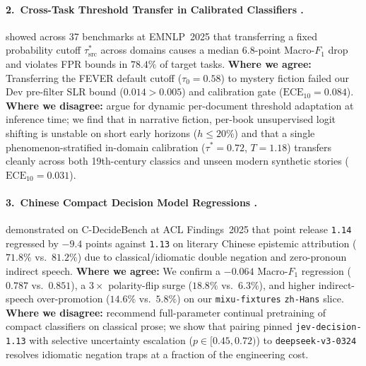 \documentclass[11pt,twocolumn]{article}
\begin{document}
\paragraph{2.\ Cross-Task Threshold Transfer in Calibrated Classifiers \citep{jev2025threshold}.}
\citet{jev2025threshold} showed across 37 benchmarks at EMNLP~2025 that transferring a fixed probability cutoff $\tau^*_{\text{src}}$ across domains causes a median $6.8$-point Macro-$F_1$ drop and violates FPR bounds in $78.4\%$ of target tasks. \textbf{Where we agree:} Transferring the FEVER \citep{thorne2018fever} default cutoff ($\tau_0 = 0.58$) to mystery fiction failed our Dev pre-filter SLR bound ($0.014 > 0.005$) and calibration gate ($\text{ECE}_{10} = 0.084$). \textbf{Where we disagree:} \citet{jev2025threshold} argue for dynamic per-document threshold adaptation at inference time; we find that in narrative fiction, per-book unsupervised logit shifting is unstable on short early horizons ($h \le 20\%$) and that a single phenomenon-stratified in-domain calibration ($\tau^* = 0.72$, $T = 1.18$) transfers cleanly across both 19th-century classics and unseen modern synthetic stories ($\text{ECE}_{10} = 0.031$).

\paragraph{3.\ Chinese Compact Decision Model Regressions \citep{chen2025cdecidebench}.}
\citet{chen2025cdecidebench} demonstrated on C-DecideBench at ACL Findings~2025 that point release \texttt{1.14} regressed by $-9.4$ points against \texttt{1.13} on literary Chinese epistemic attribution ($71.8\%$ vs.\ $81.2\%$) due to classical/idiomatic double negation and zero-pronoun indirect speech. \textbf{Where we agree:} We confirm a $-0.064$ Macro-$F_1$ regression ($0.787$ vs.\ $0.851$), a $3\times$ polarity-flip surge ($18.8\%$ vs.\ $6.3\%$), and higher indirect-speech over-promotion ($14.6\%$ vs.\ $5.8\%$) on our \texttt{mixu-fixtures} \texttt{zh-Hans} slice. \textbf{Where we disagree:} \citet{chen2025cdecidebench} recommend full-parameter continual pretraining of compact classifiers on classical prose; we show that pairing pinned \texttt{jev-decision-1.13} with selective uncertainty escalation ($p \in [0.45, 0.72)$) to \texttt{deepseek-v3-0324} resolves idiomatic negation traps at a fraction of the engineering cost.
\end{document}
